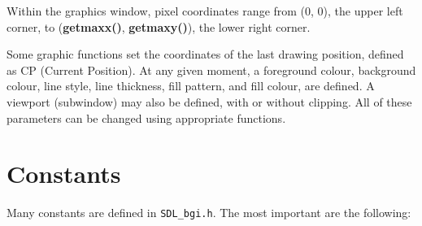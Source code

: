 \documentclass[a4paper,11pt]{article}
\newcommand{\func}[1]{\textbf{#1}}  %
\newcommand{\F}[1]{\texttt{#1}}     %
\begin{document}
Within the graphics window, pixel coordinates range from (0, 0), the
upper left corner, to (\func{getmaxx()}, \func{getmaxy()}), the lower
right corner.

Some graphic functions set the coordinates of the last drawing
position, defined as CP (Current Position). At any given moment, a
foreground colour, background colour, line style, line thickness, fill
pattern, and fill colour, are defined. A viewport (subwindow) may also
be defined, with or without clipping. All of these parameters can be
changed using appropriate functions.


\section{Constants}

Many constants are defined in \F{SDL\_bgi.h}. The most important are
the following:
\end{document}

